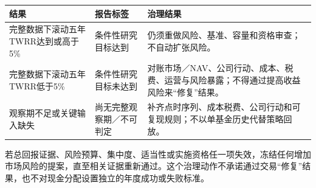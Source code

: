 \begin{exhibitbox}[实施后才会使用的总回报状态]
\small
\begin{tabularx}{\exhibitboxwidth}{L{3.0cm}P P}
\toprule
\textbf{结果} & \textbf{报告标签} & \textbf{治理结果} \\
\midrule
完整数据下滚动五年TWRR达到或高于5\% & 条件性研究目标达到 & 仍须重做风险、基准、容量和资格审查；不自动扩张风险。 \\
完整数据下滚动五年TWRR低于5\% & 条件性研究目标未达到 & 对账市场／NAV、公司行动、成本、税费、运营与风险暴露；不得通过提高收益风险来“修复”结果。 \\
观察期不足或关键输入缺失 & 尚无完整观察期／不可判定 & 补齐点时序列、成本税费、公司行动和可复现规则；不以单基金历史代替策略回放。 \\
\bottomrule
\end{tabularx}
\end{exhibitbox}

若总回报证据、风险预算、集中度、适当性或实施资格任一项失效，冻结任何增加市场风险的提案，直至相关证据重新通过。这个治理动作不承诺通过交易“修复”结果，也不对现金分配设置独立的年度成功或失败标准。
